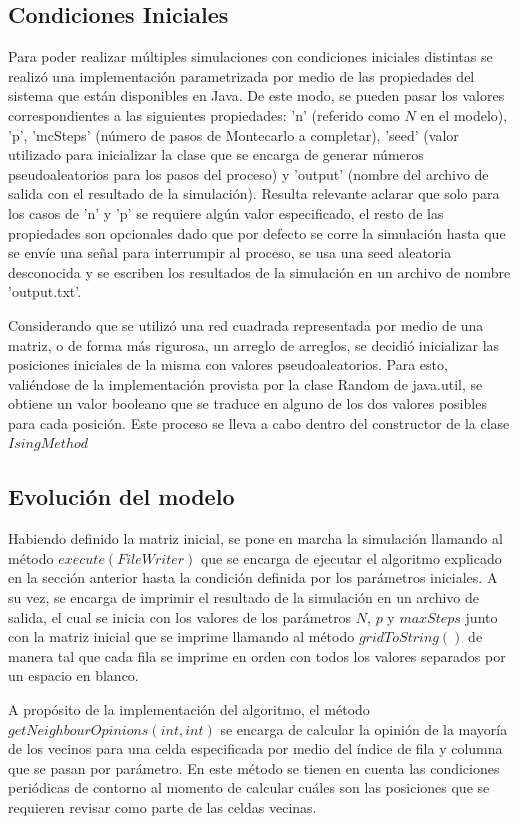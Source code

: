 \documentclass[12pt]{article}
\begin{document}
\subsection{Condiciones Iniciales}
Para poder realizar múltiples simulaciones con condiciones iniciales distintas se realizó una implementación parametrizada por medio de las propiedades del sistema que están disponibles en Java. De este modo, se pueden pasar los valores correspondientes a las siguientes propiedades: 'n' (referido como $N$ en el modelo), 'p', 'mcSteps' (número de pasos de Montecarlo a completar), 'seed' (valor utilizado para inicializar la clase que se encarga de generar números pseudoaleatorios para los pasos del proceso) y 'output' (nombre del archivo de salida con el resultado de la simulación). Resulta relevante aclarar que solo para los casos de 'n' y 'p' se requiere algún valor especificado, el resto de las propiedades son opcionales dado que por defecto se corre la simulación hasta que se envíe una señal para interrumpir al proceso, se usa una seed aleatoria desconocida y se escriben los resultados de la simulación en un archivo de nombre 'output.txt'.

Considerando que se utilizó una red cuadrada representada por medio de una matriz, o de forma más rigurosa, un arreglo de arreglos, se decidió inicializar las posiciones iniciales de la misma con valores pseudoaleatorios. Para esto, valiéndose de la implementación provista por la clase Random de java.util, se obtiene un valor booleano que se traduce en alguno de los dos valores posibles para cada posición. Este proceso se lleva a cabo dentro del constructor de la clase $IsingMethod$

\subsection{Evolución del modelo}
Habiendo definido la matriz inicial, se pone en marcha la simulación llamando al método $execute(FileWriter)$ que se encarga de ejecutar el algoritmo explicado en la sección anterior hasta la condición definida por los parámetros iniciales. A su vez, se encarga de imprimir el resultado de la simulación en un archivo de salida, el cual se inicia con los valores de los parámetros $N$, $p$ y $maxSteps$ junto con la matriz inicial que se imprime llamando al método $gridToString()$ de manera tal que cada fila se imprime en orden con todos los valores separados por un espacio en blanco.

A propósito de la implementación del algoritmo, el método $getNeighbourOpinions(int, int)$ se encarga de calcular la opinión de la mayoría de los vecinos para una celda especificada por medio del índice de fila y columna que se pasan por parámetro. En este método se tienen en cuenta las condiciones periódicas de contorno al momento de calcular cuáles son las posiciones que se requieren revisar como parte de las celdas vecinas. 
\end{document}
